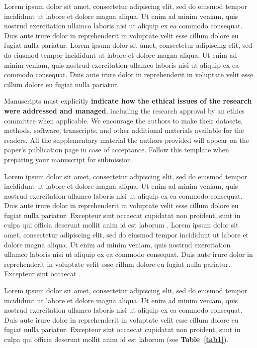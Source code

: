 \documentclass[english]{sbc2025}%
\begin{document}
Lorem ipsum dolor sit amet, consectetur adipiscing elit, sed do eiusmod tempor incididunt ut labore et dolore magna aliqua. Ut enim ad minim veniam, quis nostrud exercitation ullamco laboris nisi ut aliquip ex ea commodo consequat. Duis aute irure dolor in reprehenderit in voluptate velit esse cillum dolore eu fugiat nulla pariatur.  Lorem ipsum dolor sit amet, consectetur adipiscing elit, sed do eiusmod tempor incididunt ut labore et dolore magna aliqua. Ut enim ad minim veniam, quis nostrud exercitation ullamco laboris nisi ut aliquip ex ea commodo consequat. Duis aute irure dolor in reprehenderit in voluptate velit esse cillum dolore eu fugiat nulla pariatur. 

Manuscripts must explicitly \textbf{indicate how the ethical issues of the research were addressed and managed}, including the research approval by an ethics committee when applicable. We encourage the authors to make their datasets, methods, software, transcripts, and other additional materials available for the readers. All the supplementary material the authors provided will appear on the paper's publication page in case of acceptance. Follow this template when preparing your manuscript for submission. 

Lorem ipsum dolor sit amet, consectetur adipiscing elit, sed do eiusmod tempor incididunt ut labore et dolore magna aliqua. Ut enim ad minim veniam, quis nostrud exercitation ullamco laboris nisi ut aliquip ex ea commodo consequat. Duis aute irure dolor in reprehenderit in voluptate velit esse cillum dolore eu fugiat nulla pariatur. Excepteur sint occaecat cupidatat non proident, sunt in culpa qui officia deserunt mollit anim id est laborum \citep{ref1}. Lorem ipsum dolor sit amet, consectetur adipiscing elit, sed do eiusmod tempor incididunt ut labore et dolore magna aliqua. Ut enim ad minim veniam, quis nostrud exercitation ullamco laboris nisi ut aliquip ex ea commodo consequat. Duis aute irure dolor in reprehenderit in voluptate velit esse cillum dolore eu fugiat nulla pariatur. Excepteur sint occaecat \citep{ref2}. 

Lorem ipsum dolor sit amet, consectetur adipiscing elit, sed do eiusmod tempor incididunt ut labore et dolore magna aliqua. Ut enim ad minim veniam, quis nostrud exercitation ullamco laboris nisi ut aliquip ex ea commodo consequat. Duis aute irure dolor in reprehenderit in voluptate velit esse cillum dolore eu fugiat nulla pariatur. Excepteur sint occaecat cupidatat non proident, sunt in culpa qui officia deserunt mollit anim id est laborum (see \textbf{ Table~\ref{tab1}}).
\end{document}
